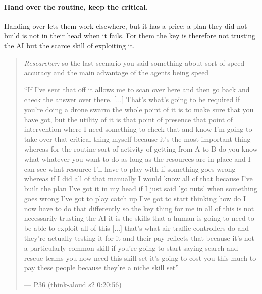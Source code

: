 
\label{sec:qual:practitioner:pt-play-catch-up}\paragraph{Hand over the routine, keep the critical.}
Handing over lets them work elsewhere, but it has a price: a plan they did not build is not in their head when it fails. For them the key is therefore not trusting the AI but the scarce skill of exploiting it.

\begin{quote}\small
{\footnotesize\textit{Researcher:} so the last scenario you said something about sort of speed accuracy and the main advantage of the agents being speed}\par\smallskip
``If I've sent that off it allows me to scan over here and then go back and check the answer over there. [...] That's what's going to be required if you're doing a drone swarm the whole point of it is to make sure that you have got, but the utility of it is that point of presence that point of intervention where I need something to check that and know I'm going to take over that critical thing myself because it's the most important thing whereas for the routine sort of activity of getting from A to B do you know what whatever you want to do as long as the resources are in place and I can see what resource I'll have to play with if something goes wrong whereas if I did all of that manually I would know all of that because I've built the plan I've got it in my head if I just said 'go nuts' when something goes wrong I've got to play catch up I've got to start thinking how do I now have to do that differently so the key thing for me in all of this is not necessarily trusting the AI it is the skills that a human is going to need to be able to exploit all of this [...] that's what air traffic controllers do and they're actually testing it for it and their pay reflects that because it's not a particularly common skill if you're going to start saying search and rescue teams you now need this skill set it's going to cost you this much to pay these people because they're a niche skill set''\par\hfill--- P36 (think-aloud s2 0:20:56)
\end{quote}

